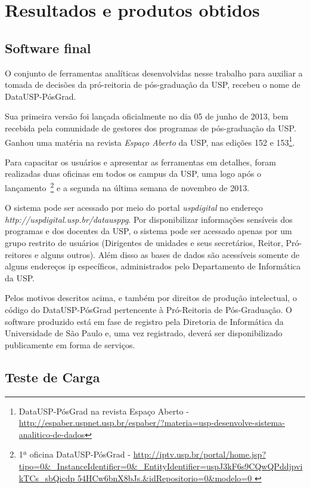 \chapter{Resultados e produtos obtidos}
\label{ch:4}

\section{Software final}
O conjunto de ferramentas analíticas desenvolvidas nesse trabalho para auxiliar a tomada de decisões da pró-reitoria
de pós-graduação da USP, recebeu o nome de DataUSP-PósGrad.
\par Sua primeira versão foi lançada oficialmente no dia 05 de junho de 2013, bem recebida pela
comunidade de gestores dos programas de pós-graduação da USP. Ganhou uma matéria na revista \emph{Espaço Aberto} da USP, nas edições 152 e 153\footnote{DataUSP-PósGrad na revista Espaço Aberto - \url{http://espaber.uspnet.usp.br/espaber/?materia=usp-desenvolve-sistema-analitico-de-dados}}.
\par Para capacitar os usuários e apresentar as ferramentas em detalhes, foram realizadas duas oficinas em todos os campus da USP, uma logo após o lançamento~\footnote{1ª oficina DataUSP-PósGrad - \url{http://iptv.usp.br/portal/home.jsp?tipo=0\&\_InstanceIdentifier=0\&\_EntityIdentifier=uspJ3kF6s9CQwQPddjpvikTCs\_sbQicdp
54HCw6bnX8bJs.\&idRepositorio=0\&modelo=0 }} e a segunda na última semana de novembro de 2013.
\par O sistema pode ser acessado por meio do portal \emph{uspdigital} no endereço \emph{http://uspdigital.usp.br/datausppg}. Por disponibilizar informações sensíveis dos programas e dos docentes da USP, o sistema pode ser acessado apenas por um grupo restrito de usuários (Dirigentes de unidades e seus secretários, Reitor, Pró-reitores e alguns outros). Além disso as bases de dados são acessíveis somente de alguns endereços ip específicos, administrados pelo Departamento de Informática da USP.
\par Pelos motivos descritos acima, e também por direitos de produção intelectual, o código do DataUSP-PósGrad pertencente à Pró-Reitoria de Pós-Graduação. O software produzido está em fase de registro pela Diretoria de Informática da Universidade de São Paulo e, uma vez registrado, deverá ser disponibilizado publicamente em forma de serviços.

\section{Teste de Carga}

